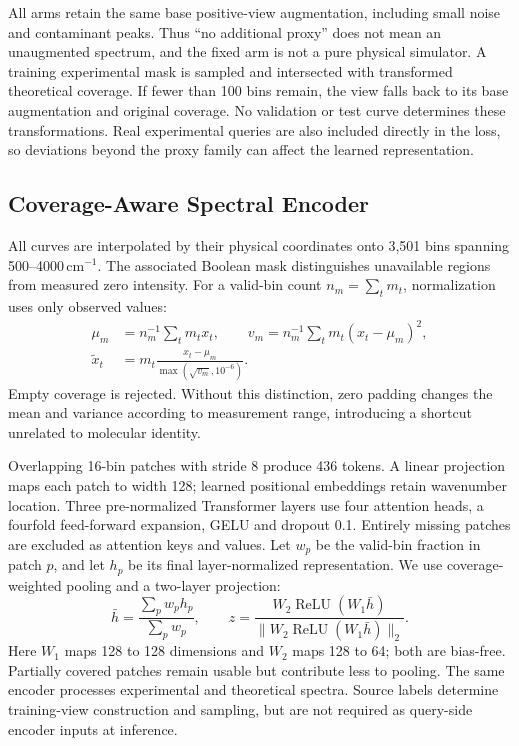 All arms retain the same base positive-view augmentation, including small noise and contaminant peaks. Thus ``no additional proxy'' does not mean an unaugmented spectrum, and the fixed arm is not a pure physical simulator. A training experimental mask is sampled and intersected with transformed theoretical coverage. If fewer than 100 bins remain, the view falls back to its base augmentation and original coverage. No validation or test curve determines these transformations. Real experimental queries are also included directly in the loss, so deviations beyond the proxy family can affect the learned representation.

\subsection{Coverage-Aware Spectral Encoder}\label{sec:encoder}
All curves are interpolated by their physical coordinates onto 3,501 bins spanning 500--4000\,cm$^{-1}$. The associated Boolean mask distinguishes unavailable regions from measured zero intensity. For a valid-bin count $n_m=\sum_t m_t$, normalization uses only observed values:
\begin{align}
\mu_m&=n_m^{-1}\sum_t m_tx_t,\qquad
v_m=n_m^{-1}\sum_t m_t(x_t-\mu_m)^2,\\
\widetilde{x}_t&=m_t\frac{x_t-\mu_m}{\max(\sqrt{v_m},10^{-6})}.
\end{align}
Empty coverage is rejected. Without this distinction, zero padding changes the mean and variance according to measurement range, introducing a shortcut unrelated to molecular identity.

Overlapping 16-bin patches with stride 8 produce 436 tokens. A linear projection maps each patch to width 128; learned positional embeddings retain wavenumber location. Three pre-normalized Transformer layers use four attention heads, a fourfold feed-forward expansion, GELU and dropout 0.1. Entirely missing patches are excluded as attention keys and values. Let $w_p$ be the valid-bin fraction in patch $p$, and let $h_p$ be its final layer-normalized representation. We use coverage-weighted pooling and a two-layer projection:
\begin{equation}\label{eq:embedding}
\bar h=\frac{\sum_p w_ph_p}{\sum_p w_p},\qquad
z=\frac{W_2\operatorname{ReLU}(W_1\bar h)}
 {\|W_2\operatorname{ReLU}(W_1\bar h)\|_2}.
\end{equation}
Here $W_1$ maps 128 to 128 dimensions and $W_2$ maps 128 to 64; both are bias-free. Partially covered patches remain usable but contribute less to pooling. The same encoder processes experimental and theoretical spectra. Source labels determine training-view construction and sampling, but are not required as query-side encoder inputs at inference.


